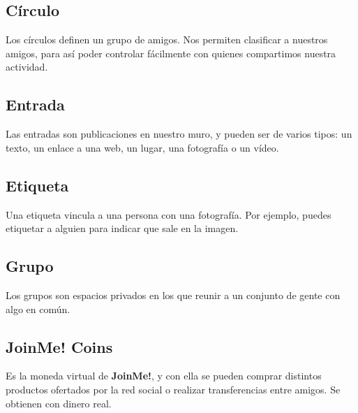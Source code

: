 \documentclass[12pt, a4paper, titlepage]{article}
\begin{document}
\subsection{Círculo}

Los círculos definen un grupo de amigos. Nos permiten clasificar a nuestros amigos, para así poder controlar fácilmente con quienes compartimos nuestra actividad.

\subsection{Entrada}

Las entradas son publicaciones en nuestro muro, y pueden ser de varios tipos: un texto, un enlace a una web, un lugar, una fotografía o un vídeo.

\subsection{Etiqueta}

Una etiqueta vincula a una persona con una fotografía. Por ejemplo, puedes etiquetar a alguien para indicar que sale en la imagen.

\subsection{Grupo}

Los grupos son espacios privados en los que reunir a un conjunto de gente con algo en común.

\subsection{JoinMe! Coins}

Es la moneda virtual de \textbf{JoinMe!}, y con ella se pueden comprar distintos productos ofertados por la red social o realizar transferencias entre amigos. Se obtienen con dinero real.

\end{document}

